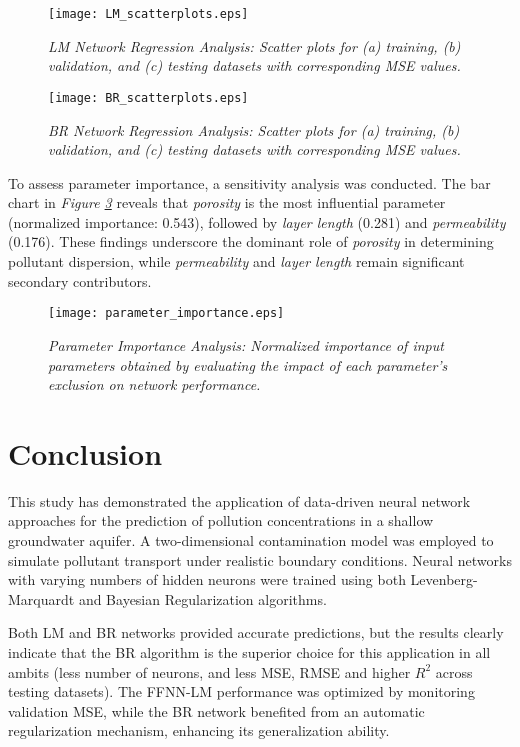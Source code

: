 \documentclass[10pt]{article}
\begin{document}
	\begin{figure}[H]
		\centering
		\texttt{[image: LM\_scatterplots.eps]}
		\caption{\textit{LM Network Regression Analysis: Scatter plots for (a) training, (b) validation, and (c) testing datasets with corresponding MSE values.}}
		\label{fig:lm_sct}
	\end{figure}
	
	\begin{figure}[H]
		\centering
		\texttt{[image: BR\_scatterplots.eps]}
		\caption{\textit{BR Network Regression Analysis: Scatter plots for (a) training, (b) validation, and (c) testing datasets with corresponding MSE values.}}
		\label{fig:br_sct}
	\end{figure}
	
	To assess parameter importance, a sensitivity analysis was conducted. The bar chart in \textit{Figure \ref{fig:param_imp}} reveals that \textit{porosity} is the most influential parameter (normalized importance: 0.543), followed by \textit{layer length} (0.281) and \textit{permeability} (0.176). These findings underscore the dominant role of \textit{porosity} in determining pollutant dispersion, while \textit{permeability} and \textit{layer length} remain significant secondary contributors.
	
	\begin{figure}[H]
		\centering
		\texttt{[image: parameter\_importance.eps]}
		\caption{\textit{Parameter Importance Analysis: Normalized importance of input parameters obtained by evaluating the impact of each parameter's exclusion on network performance.}}
		\label{fig:param_imp}
	\end{figure}
	
	\section{Conclusion}
	This study has demonstrated the application of data-driven neural network approaches for the prediction of pollution concentrations in a shallow groundwater aquifer. A two-dimensional contamination model was employed to simulate pollutant transport under realistic boundary conditions. Neural networks with varying numbers of hidden neurons were trained using both Levenberg-Marquardt and Bayesian Regularization algorithms.
	
	Both LM and BR networks provided accurate predictions, but the results clearly indicate that the BR algorithm is the superior choice for this application in all ambits (less number of neurons, and less MSE, RMSE and higher $R^2$ across testing datasets). The FFNN-LM performance was optimized by monitoring validation MSE, while the BR network benefited from an automatic regularization mechanism, enhancing its generalization ability.
	
\end{document}
